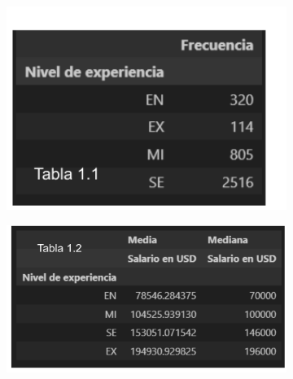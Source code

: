 \documentclass{article}
\begin{document}
	\begin{figure}[htbp] %
	\begin{subfigure}[b]{1.1\textwidth}
		\includegraphics[width=1.2\textwidth]{FigurasTablas/tabla1.1.png}
		\label{tabla 1.1}
	\end{subfigure}	

	\begin{subfigure}[b]{1.1\textwidth}
	\includegraphics[width=1.2\textwidth]{FigurasTablas/tabla1.2.png}
		\label{tabla 1.2}
	\end{subfigure}	
	\end{figure}
\end{document}
